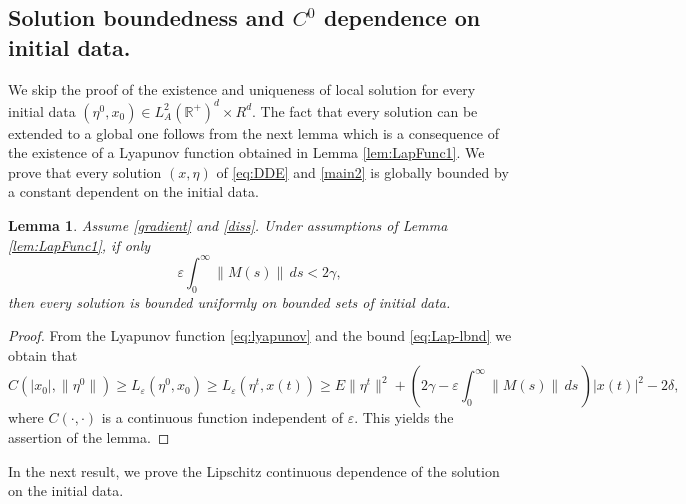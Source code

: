 \documentclass[11pt, leqno]{amsart}
\newtheorem{lem}[thm]{Lemma}
\theoremstyle{definition}
\def\R{\mathbb{R}}
\begin{document}
\subsection{Solution boundedness and $C^0$ dependence on initial data.}

 We skip the proof of the existence and uniqueness of local solution for every initial data $(\eta^0,x_0)\in  L^2_A(\R^+)^d\times R^d$. The fact that every solution can be extended to a global one follows from the next lemma which is a consequence of the existence of a Lyapunov function obtained in Lemma \ref{lem:LapFunc1}.
We prove that every solution $(x,\eta)$ of \eqref{eq:DDE} and \eqref{main2} is globally bounded by a constant dependent on the initial data.
\begin{lem}\label{le:bound}
Assume \eqref{gradient} and \eqref{diss}.  Under assumptions of Lemma \ref{lem:LapFunc1},  if only
\begin{equation}\label{boundepsilon}
\varepsilon\int_0^\infty\|M(s)\|\, ds < 2\gamma,
\end{equation}
then every solution is bounded uniformly on bounded sets of initial data.
\end{lem}
\begin{proof}
From
the Lyapunov function \eqref{eq:lyapunov} and the bound \eqref{eq:Lap-lbnd} we obtain that
$$
 C(|x_0|, \|\eta^0\|) \geq L_\varepsilon(\eta^0,x_0) \geq L_\varepsilon(\eta^t,x(t)) \geq E\|\eta^t\|^2 + \left(2 \gamma  - \varepsilon\int_0^\infty \|M(s)\|\, ds\,\right)|x(t)|^2 - 2 \delta,
$$
where $C(\cdot,\cdot)$ is a continuous function independent of $\varepsilon$. This yields the assertion of the lemma.
\end{proof}
 In the next result, we prove the Lipschitz continuous dependence of the solution on the initial data.
	
\end{document}
